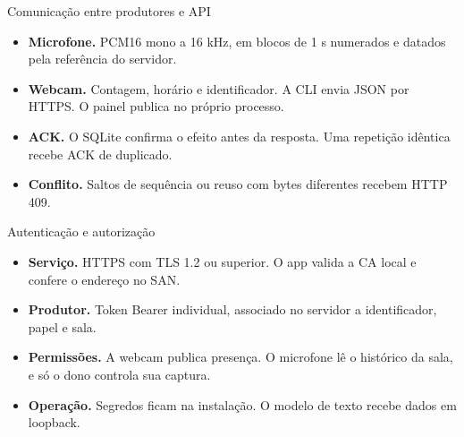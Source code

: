\documentclass[aspectratio=169,t,xcolor=table]{beamer}
\begin{document}
\begin{frame}{Comunicação entre produtores e API}
  \begin{itemize}
    \item \textbf{Microfone.} PCM16 mono a 16 kHz, em blocos de 1 s numerados e datados pela referência do servidor.
    \item \textbf{Webcam.} Contagem, horário e identificador. A CLI envia JSON por HTTPS. O painel publica no próprio processo.
    \item \textbf{ACK.} O SQLite confirma o efeito antes da resposta. Uma repetição idêntica recebe ACK de duplicado.
    \item \textbf{Conflito.} Saltos de sequência ou reuso com bytes diferentes recebem HTTP 409.
  \end{itemize}
\end{frame}

\begin{frame}{Autenticação e autorização}
  \begin{itemize}
    \item \textbf{Serviço.} HTTPS com TLS 1.2 ou superior. O app valida a CA local e confere o endereço no SAN.
    \item \textbf{Produtor.} Token Bearer individual, associado no servidor a identificador, papel e sala.
    \item \textbf{Permissões.} A webcam publica presença. O microfone lê o histórico da sala, e só o dono controla sua captura.
    \item \textbf{Operação.} Segredos ficam na instalação. O modelo de texto recebe dados em loopback.
  \end{itemize}
\end{frame}
\end{document}

